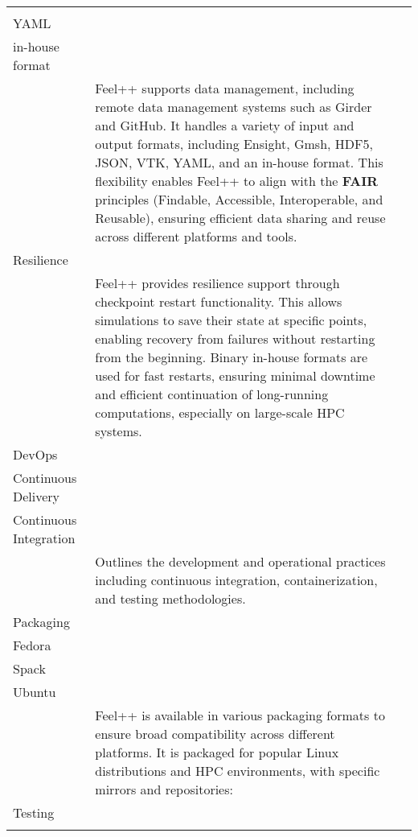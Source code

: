 \begin{table}[h!]
{{\begin{longtable}{lp{}p{}}
\begin{tabular}{l}
VTK\\
YAML\\
in-house format\\
\end{tabular} & Feel++ supports data management, including remote data management systems such as Girder and GitHub. It handles a variety of input and output formats, including Ensight, Gmsh, HDF5, JSON, VTK, YAML, and an in-house format. This flexibility enables Feel++ to align with the \textbf{FAIR} principles (Findable, Accessible, Interoperable, and Reusable), ensuring efficient data sharing and reuse across different platforms and tools.\\
        \rowcolor{numpexlightergray}Resilience  & \begin{tabular}{l}
Checkpoint restart\\
\end{tabular} & Feel++ provides resilience support through checkpoint restart functionality. This allows simulations to save their state at specific points, enabling recovery from failures without restarting from the beginning. Binary in-house formats are used for fast restarts, ensuring minimal downtime and efficient continuation of long-running computations, especially on large-scale HPC systems.\\
        \rowcolor{white}DevOps & \begin{tabular}{l}
Continuous Benchmarking\\
Continuous Delivery\\
Continuous Integration\\
\end{tabular} & Outlines the development and operational practices including continuous integration, containerization, and testing methodologies.  \\
        \rowcolor{numpexlightergray}Packaging  & \begin{tabular}{l}
Debian\\
Fedora\\
Spack\\
Ubuntu\\
\end{tabular} & Feel++ is available in various packaging formats to ensure broad compatibility across different platforms. It is packaged for popular Linux distributions and HPC environments, with specific mirrors and repositories:\\
        \rowcolor{white}Testing  & \begin{tabular}{l}
Unit\\

\end{tabular}
\end{longtable}}}
\end{table}
